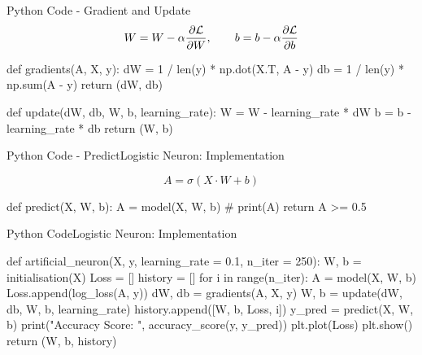 \documentclass[aspectratio=169]{beamer}
\begin{document}
%
%
\begin{frame}[fragile]{Python Code - Gradient and Update}    
    \vspace{0.2cm}
    \[
    W = W - \alpha \frac{\partial \cal{L}}{\partial W}, \quad \quad 
    b = b - \alpha \frac{\partial \cal{L}}{\partial b} 
    \]

    \vspace{0.2cm}
    \begin{codebox}
def gradients(A, X, y):
    dW = 1 / len(y) * np.dot(X.T, A - y)
    db = 1 / len(y) * np.sum(A - y)
    return (dW, db)
    
def update(dW, db, W, b, learning_rate):
    W = W - learning_rate * dW
    b = b - learning_rate * db
    return (W, b)
    \end{codebox}

\end{frame}
%
%
\begin{frame}[fragile]{Python Code - Predict}{Logistic Neuron: Implementation}
    
    \vspace{0.2cm}
    \[
    A = \sigma \left(X \cdot W + b\right)    
    \]

    \vspace{0.5cm}
    \begin{codebox}
def predict(X, W, b):
    A = model(X, W, b)
    # print(A)
    return A >= 0.5
    \end{codebox}

\end{frame}
%
%
\begin{frame}[fragile]{Python Code}{Logistic Neuron: Implementation}
    \begin{codebox2}
def artificial_neuron(X, y, 
                      learning_rate = 0.1, 
                      n_iter = 250):
    W, b = initialisation(X)
    Loss = []
    history = []
    for i in range(n_iter):
        A = model(X, W, b)
        Loss.append(log_loss(A, y))
        dW, db = gradients(A, X, y)
        W, b = update(dW, db, W, b, learning_rate)
        history.append([W, b, Loss, i])
    y_pred = predict(X, W, b)
    print("Accuracy Score: ", accuracy_score(y, y_pred))
    plt.plot(Loss)
    plt.show()
    return (W, b, history)
\end{codebox2}

\end{frame}
\end{document}
